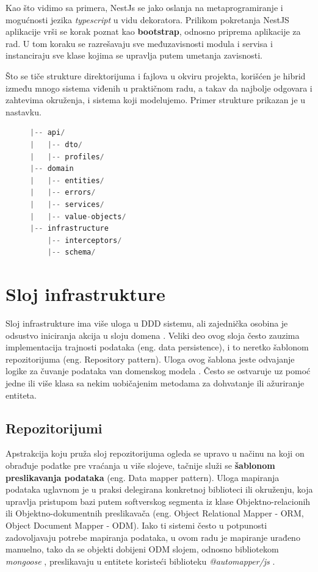 \documentclass[12pt,oneside]{memoir}
\begin{document}
Kao što vidimo sa primera, NestJs se jako oslanja na metaprogramiranje i mogućnosti jezika \textit{typescript} u vidu dekoratora. Prilikom pokretanja NestJS aplikacije vrši se korak poznat kao \textbf{bootstrap}, odnosno priprema aplikacije za rad. U tom koraku se razrešavaju sve međuzavisnosti modula i servisa i instanciraju sve klase kojima se upravlja putem umetanja zavisnosti.

Što se tiče strukture direktorijuma i fajlova u okviru projekta, korišćen je hibrid između mnogo sistema viđenih u praktičnom radu, a takav da najbolje odgovara i zahtevima okruženja, i sistema koji modelujemo. Primer strukture prikazan je u nastavku.

\begin{figure}[h]
\begin{lstlisting}[language=JavaScript, style=ES6, caption={fajl tickets.module.ts}]
|-- api/
|   |-- dto/
|   |-- profiles/
|-- domain
|   |-- entities/
|   |-- errors/
|   |-- services/
|   |-- value-objects/
|-- infrastructure
    |-- interceptors/
    |-- schema/
\end{lstlisting}
\end{figure}

\section{Sloj infrastrukture}

Sloj infrastrukture ima više uloga u DDD sistemu, ali zajednička osobina je odsustvo iniciranja akcija u sloju domena \cite{dddfull}. Veliki deo ovog sloja često zauzima implementacija trajnosti podataka (eng. data persistence), i to neretko šablonom repozitorijuma (eng. Repository pattern). Uloga ovog šablona jeste odvajanje logike za čuvanje podataka van domenskog modela \cite{msrepository}. Često se ostvaruje uz pomoć jedne ili više klasa sa nekim uobičajenim metodama za dohvatanje ili ažuriranje entiteta.


\subsection{Repozitorijumi}
Apstrakcija koju pruža sloj repozitorijuma ogleda se upravo u načinu na koji on obrađuje podatke pre vraćanja u više slojeve, tačnije služi se \textbf{šablonom preslikavanja podataka} (eng. Data mapper pattern). Uloga mapiranja podataka uglavnom je u praksi delegirana konkretnoj biblioteci ili okruženju, koja upravlja pristupom bazi putem softverskog segmenta iz klase Objektno-relacionih ili Objektno-dokumentnih preslikavača (eng. Object Relational Mapper - ORM, Object Document Mapper - ODM). Iako ti sistemi često u potpunosti zadovoljavaju potrebe mapiranja podataka, u ovom radu je mapiranje urađeno manuelno, tako da se objekti dobijeni ODM slojem, odnosno bibliotekom \textit{mongoose} \cite{mongoosedocs}, preslikavaju u entitete koristeći biblioteku \textit{@automapper/js} \cite{automapperjsdocs}.
\end{document}
